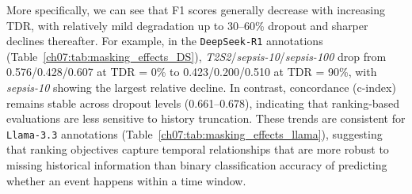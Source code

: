 More specifically, we can see that F1 scores generally decrease with increasing TDR, with relatively mild degradation up to 30--60\% dropout and sharper declines thereafter.
For example, in the \texttt{DeepSeek-R1} annotations (Table~\ref{ch07:tab:masking_effects_DS}), \textit{T2S2}/\textit{sepsis-10}/\textit{sepsis-100} drop from 0.576/0.428/0.607 at TDR = 0\% to 0.423/0.200/0.510 at TDR = 90\%, with \textit{sepsis-10} showing the largest relative decline.
In contrast, concordance (c-index) remains stable across dropout levels (0.661--0.678), indicating that ranking-based evaluations are less sensitive to history truncation.
These trends are consistent for \texttt{Llama-3.3} annotations (Table~\ref{ch07:tab:masking_effects_llama}), suggesting that ranking objectives capture temporal relationships that are more robust to missing historical information than binary classification accuracy of predicting whether an event happens within a time window.








\FloatBarrier
